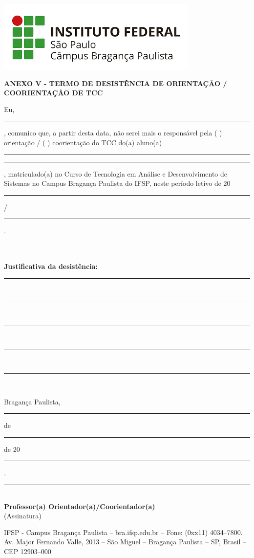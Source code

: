 \documentclass[12pt,a4paper]{report}
\newcommand{\cabecalho}{ANEXO V - TERMO DE DESISTÊNCIA DE ORIENTAÇÃO / COORIENTAÇÃO DE TCC}
\begin{document}
	\includegraphics[scale=0.35]{IFSP-BRA.png}	\hline
\vspace{1.2cm}
	\begin{center}
		{\large\textbf{\cabecalho}}\\
	\end{center}
	
	\vspace{1.2cm}
	\noindent \large{Eu, \rule{12cm}{0.1pt}, comunico que, a partir desta data, não serei mais o responsável pela (\hspace{0.4cm} ) orientação / ( \hspace{0.4cm} ) coorientação do TCC do(a) aluno(a) \rule{9.5cm}{0.1pt} \rule{9.5cm}{0.1pt}, matriculado(a) no Curso de Tecnologia em Análise e Desenvolvimento de Sistemas no Campus Bragança Paulista do IFSP, neste período letivo de 20\rule{1cm}{0.1pt} \hspace{0.01cm}/\rule{1cm}{0.1pt} \hspace{0.01cm}.} \\
	\\
	\noindent \textbf{Justificativa da desistência:} \rule{10cm}{0.1pt} \\
	\rule{17cm}{0.1pt} \\
	\rule{17cm}{0.1pt} \\
	\rule{17cm}{0.1pt} \\
	\rule{17cm}{0.1pt} \\
    
    \begin{center}
        {Bragança Paulista, \rule{1cm}{0.1pt} de \rule{5cm}{0.1pt} de 20\rule{1cm}{0.1pt}.}
	\end{center}
	\vspace{2cm}
	\begin{table}[ht]
		\centering \rule{10cm}{0.1pt}               
		\\ \small{\textbf{Professor(a) Orientador(a)/Coorientador(a)}}
		\\ \small{(Assinatura)}
	\end{table}

    \vspace{3cm}
	\hline 
	\vspace{0.2cm}
	\centering \tiny{IFSP - Campus Bragança Paulista – bra.ifsp.edu.br – Fone: (0xx11) 4034–7800.
Av. Major Fernando Valle, 2013 – São Miguel – Bragança Paulista – SP, Brasil – CEP 12903–000}
\end{document}
